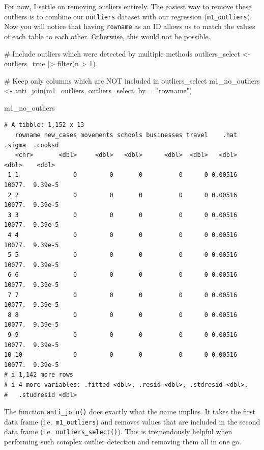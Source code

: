 \documentclass[
  letterpaper,
]{krantz}
\makeatletter
\newenvironment{Shaded}{\begin{snugshade}}{\end{snugshade}}
\newcommand{\AttributeTok}[1]{\textcolor[rgb]{0.40,0.45,0.13}{#1}}
\newcommand{\CommentTok}[1]{\textcolor[rgb]{0.37,0.37,0.37}{#1}}
\newcommand{\DecValTok}[1]{\textcolor[rgb]{0.68,0.00,0.00}{#1}}
\newcommand{\FunctionTok}[1]{\textcolor[rgb]{0.28,0.35,0.67}{#1}}
\newcommand{\NormalTok}[1]{\textcolor[rgb]{0.00,0.23,0.31}{#1}}
\newcommand{\OtherTok}[1]{\textcolor[rgb]{0.00,0.23,0.31}{#1}}
\newcommand{\SpecialCharTok}[1]{\textcolor[rgb]{0.37,0.37,0.37}{#1}}
\newcommand{\StringTok}[1]{\textcolor[rgb]{0.13,0.47,0.30}{#1}}
\newenvironment{kframe}{%
\medskip{}
\setlength{\fboxsep}{.8em}
 \def\at@end@of@kframe{}%
 \ifinner\ifhmode%
  \def\at@end@of@kframe{\end{minipage}}%
  \begin{minipage}{\columnwidth}%
 \fi\fi%
 \def\FrameCommand##1{\hskip\@totalleftmargin \hskip-\fboxsep
 \colorbox{shadecolor}{##1}\hskip-\fboxsep
     \hskip-\linewidth \hskip-\@totalleftmargin \hskip\columnwidth}%
 \MakeFramed {\advance\hsize-\width
   \@totalleftmargin\z@ \linewidth\hsize
   \@setminipage}}%
 {\par\unskip\endMakeFramed%
 \at@end@of@kframe}
\renewenvironment{Shaded}{\begin{kframe}}{\end{kframe}}
\makeatother
\begin{document}
For now, I settle on removing outliers entirely. The easiest way to
remove these outliers is to combine our \texttt{outliers} dataset with
our regression (\texttt{m1\_outliers}). Now you will notice that having
\texttt{rowname} as an ID allows us to match the values of each table to
each other. Otherwise, this would not be possible.

\begin{Shaded}
\begin{Highlighting}[]
\CommentTok{\# Include outliers which were detected by multiple methods}
\NormalTok{outliers\_select }\OtherTok{\textless{}{-}}
\NormalTok{  outliers\_true }\SpecialCharTok{|\textgreater{}}
  \FunctionTok{filter}\NormalTok{(n }\SpecialCharTok{\textgreater{}} \DecValTok{1}\NormalTok{)}

\CommentTok{\# Keep only columns which are NOT included in outliers\_select}
\NormalTok{m1\_no\_outliers }\OtherTok{\textless{}{-}} \FunctionTok{anti\_join}\NormalTok{(m1\_outliers, outliers\_select, }\AttributeTok{by =} \StringTok{"rowname"}\NormalTok{)}

\NormalTok{m1\_no\_outliers}
\end{Highlighting}
\end{Shaded}

\begin{verbatim}
# A tibble: 1,152 x 13
   rowname new_cases movements schools businesses travel    .hat .sigma  .cooksd
   <chr>       <dbl>     <dbl>   <dbl>      <dbl>  <dbl>   <dbl>  <dbl>    <dbl>
 1 1               0         0       0          0      0 0.00516 10077.  9.39e-5
 2 2               0         0       0          0      0 0.00516 10077.  9.39e-5
 3 3               0         0       0          0      0 0.00516 10077.  9.39e-5
 4 4               0         0       0          0      0 0.00516 10077.  9.39e-5
 5 5               0         0       0          0      0 0.00516 10077.  9.39e-5
 6 6               0         0       0          0      0 0.00516 10077.  9.39e-5
 7 7               0         0       0          0      0 0.00516 10077.  9.39e-5
 8 8               0         0       0          0      0 0.00516 10077.  9.39e-5
 9 9               0         0       0          0      0 0.00516 10077.  9.39e-5
10 10              0         0       0          0      0 0.00516 10077.  9.39e-5
# i 1,142 more rows
# i 4 more variables: .fitted <dbl>, .resid <dbl>, .stdresid <dbl>,
#   .studresid <dbl>
\end{verbatim}

The function \texttt{anti\_join()} does exactly what the name implies.
It takes the first data frame (i.e.~\texttt{m1\_outliers}) and removes
values that are included in the second data frame
(i.e.~\texttt{outliers\_select()}). This is tremendously helpful when
performing such complex outlier detection and removing them all in one
go.
\end{document}
